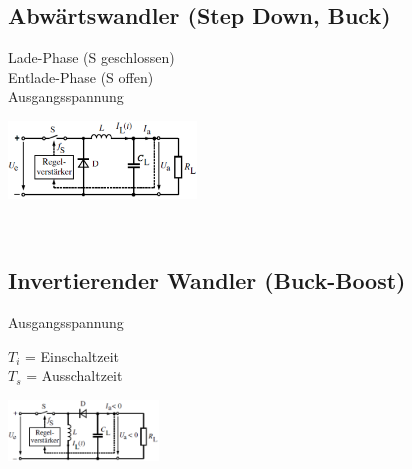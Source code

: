 \subsection{Abw\"artswandler (Step Down, Buck)}
  \begin{minipage}[T]{14cm}
    Lade-Phase (S geschlossen)
    \hspace{0.5mm}\\  
    Entlade-Phase (S offen)
    \hspace{5.8mm}\\
    Ausgangsspannung
    \hspace{13mm}\\
  \end{minipage}
  \begin{minipage}{5cm}
    \includegraphics[width=5cm]{./bilder/ReglerStepDown.png}
  \end{minipage}\\
        
\subsection{Invertierender Wandler (Buck-Boost)}
  \begin{minipage}[T]{8cm}
    Ausgangsspannung
    \hspace{13mm}\\
  \end{minipage}
  \begin{minipage}{6cm}
    $T_i$ = Einschaltzeit\\
    $T_s$ = Ausschaltzeit
  \end{minipage}
  \begin{minipage}{5cm}
    \includegraphics[width=4cm]{./bilder/ReglerInvert.png}
  \end{minipage}\\
        
